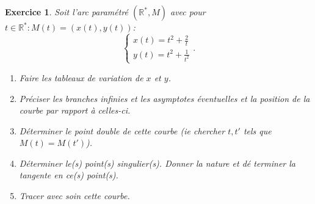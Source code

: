 \documentclass[12pt,a4paper]{article}
\newcommand{\R}{\mathbb{R}}
\theoremstyle{break}
\newtheorem{Exo}{Exercice}
\begin{document}
\begin{Exo}
	Soit l'arc param\'{e}tr\'{e} $(\R^*,M)$ avec pour $t\in\R^*:M(t)=(x(t),y(t))$:%
	\begin{equation*}
		\left\{ 
		\begin{array}{c}
			x(t)=t^{2}+\frac{2}{t} \\ 
			y(t)=t^{2}+\frac{1}{t^{2}}%
		\end{array}%
		\right. .
	\end{equation*}
	
	\begin{enumerate}
				\item Faire les tableaux de variation de $x$ et $y$.
		\item Pr\'{e}ciser les branches infinies et les asymptotes \'{e}ventuelles et la
		position de la courbe par rapport \`{a} celles-ci.
		
		\item D\'{e}terminer le point double de cette courbe (ie chercher $t,t'$ tels que $M(t)=M(t')$).
		
		\item D\'{e}terminer le(s) point(s) singulier(s). Donner la nature et d\'{e}%
		terminer la tangente en ce(s) point(s).
		

		
		\item Tracer avec soin cette courbe.
	\end{enumerate}
\end{Exo}
\end{document}
